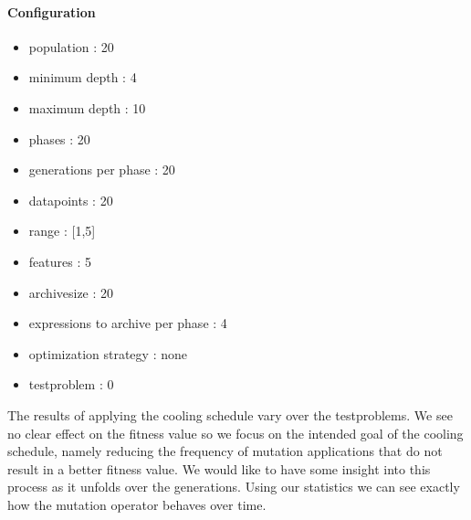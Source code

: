 \paragraph{Configuration}
\begin{itemize}
\item population : 20
\item minimum depth : 4
\item maximum depth : 10
\item phases : 20
\item generations per phase : 20
\item datapoints : 20
\item range : [1,5]
\item features : 5
\item archivesize : 20
\item expressions to archive per phase : 4
\item optimization strategy : none
\item testproblem : 0
\end{itemize}
The results of applying the cooling schedule vary over the testproblems. We see no clear effect on the fitness value so we focus on the intended goal of the cooling schedule, namely reducing the frequency of mutation applications that do not result in a better fitness value. We would like to have some insight into this process as it unfolds over the generations. Using our statistics we can see exactly how the mutation operator behaves over time.
